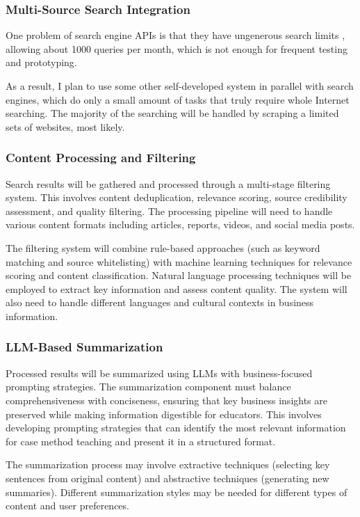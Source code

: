\documentclass[final-report]{report-template}
\begin{document}
\subsubsection{Multi-Source Search Integration} 
One problem of search engine APIs is that they have ungenerous search limits
\cite{search.api.limit.1}, allowing about 1000 queries per month, which is not
enough for frequent testing and prototyping.

As a result, I plan to use some other self-developed system in parallel with
search engines, which do only a small amount of tasks that truly require whole
Internet searching. The majority of the searching will be handled by scraping a
limited sets of websites, most likely.

\subsubsection{Content Processing and Filtering} Search results will be
gathered and processed through a multi-stage filtering system. This involves
content deduplication, relevance scoring, source credibility assessment, and
quality filtering. The processing pipeline will need to handle various content
formats including articles, reports, videos, and social media posts.

The filtering system will combine rule-based approaches (such as keyword
matching and source whitelisting) with machine learning techniques for
relevance scoring and content classification. Natural language processing
techniques will be employed to extract key information and assess content
quality. The system will also need to handle different languages and cultural
contexts in business information.

\subsubsection{LLM-Based Summarization} Processed results will be summarized
using LLMs with business-focused prompting strategies. The summarization
component must balance comprehensiveness with conciseness, ensuring that key
business insights are preserved while making information digestible for
educators. This involves developing prompting strategies that can identify the
most relevant information for case method teaching and present it in a
structured format.

The summarization process may involve extractive techniques (selecting key
sentences from original content) and abstractive techniques (generating new
summaries). Different summarization styles may be needed for different types of
content and user preferences.
\end{document}
